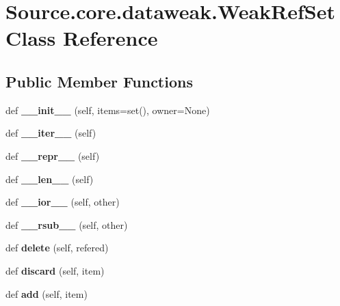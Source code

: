 \hypertarget{classSource_1_1core_1_1dataweak_1_1WeakRefSet}{}\section{Source.\+core.\+dataweak.\+Weak\+Ref\+Set Class Reference}
\label{classSource_1_1core_1_1dataweak_1_1WeakRefSet}
\subsection*{Public Member Functions}
\begin{DoxyCompactItemize}
\item 
\mbox{\label{classSource_1_1core_1_1dataweak_1_1WeakRefSet_afd9431b29def930ddae6975f5625ca39}} 
def {\bfseries \+\_\+\+\_\+init\+\_\+\+\_\+} (self, items=set(), owner=None)
\item 
\mbox{\label{classSource_1_1core_1_1dataweak_1_1WeakRefSet_a5fc0a1d613fb3705d3db158a5d91960d}} 
def {\bfseries \+\_\+\+\_\+iter\+\_\+\+\_\+} (self)
\item 
\mbox{\label{classSource_1_1core_1_1dataweak_1_1WeakRefSet_a43ae058f44c3e6914acf1099282fb91d}} 
def {\bfseries \+\_\+\+\_\+repr\+\_\+\+\_\+} (self)
\item 
\mbox{\label{classSource_1_1core_1_1dataweak_1_1WeakRefSet_a8661da89878bd538d874f8a20f874419}} 
def {\bfseries \+\_\+\+\_\+len\+\_\+\+\_\+} (self)
\item 
\mbox{\label{classSource_1_1core_1_1dataweak_1_1WeakRefSet_a97b08b11a22cbf66919af37fcedac381}} 
def {\bfseries \+\_\+\+\_\+ior\+\_\+\+\_\+} (self, other)
\item 
\mbox{\label{classSource_1_1core_1_1dataweak_1_1WeakRefSet_ab8919c1838c75617f728e017b8615a70}} 
def {\bfseries \+\_\+\+\_\+rsub\+\_\+\+\_\+} (self, other)
\item 
\mbox{\label{classSource_1_1core_1_1dataweak_1_1WeakRefSet_a303e3078fe9049ad8909c6d2c4bd5c23}} 
def {\bfseries delete} (self, refered)
\item 
\mbox{\label{classSource_1_1core_1_1dataweak_1_1WeakRefSet_a01c976e2adf037210a018f1d4b5d2558}} 
def {\bfseries discard} (self, item)
\item 
\mbox{\label{classSource_1_1core_1_1dataweak_1_1WeakRefSet_a1586db17918bf67f3cbd54ba6cd8932b}} 
def {\bfseries add} (self, item)
\end{DoxyCompactItemize}
